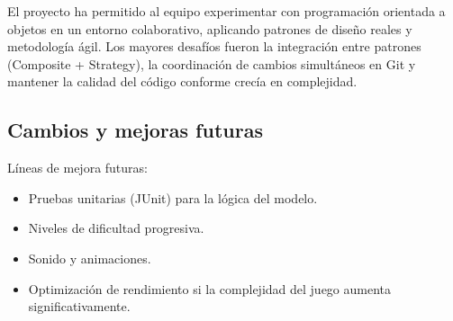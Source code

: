 \documentclass[12pt, a4paper]{article}
\begin{document}
El proyecto ha permitido al equipo experimentar con programación orientada a objetos en un entorno colaborativo, aplicando patrones de diseño reales y metodología ágil. Los mayores desafíos fueron la integración entre patrones (Composite + Strategy), la coordinación de cambios simultáneos en Git y mantener la calidad del código conforme crecía en complejidad.

\subsection{Cambios y mejoras futuras}

Líneas de mejora futuras:

\begin{itemize}[leftmargin=2em]
    \item Pruebas unitarias (JUnit) para la lógica del modelo.
    \item Niveles de dificultad progresiva.
    \item Sonido y animaciones.
    \item Optimización de rendimiento si la complejidad del juego aumenta significativamente.
\end{itemize}

\vspace{2em}
\end{document}
